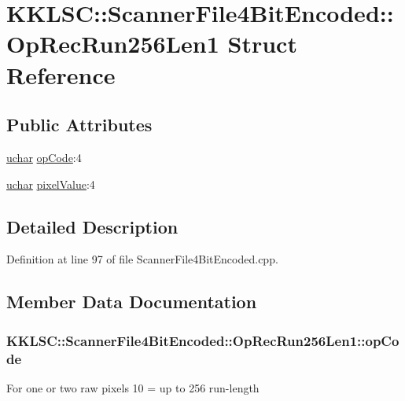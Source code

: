 \hypertarget{struct_scanner_file4_bit_encoded_1_1_op_rec_run256_len1}{}\section{K\+K\+L\+SC\+:\+:Scanner\+File4\+Bit\+Encoded\+:\+:Op\+Rec\+Run256\+Len1 Struct Reference}
\label{struct_scanner_file4_bit_encoded_1_1_op_rec_run256_len1}
\subsection*{Public Attributes}
\begin{DoxyCompactItemize}
\item 
\hyperlink{namespace_k_k_b_ace9969169bf514f9ee6185186949cdf7}{uchar} \hyperlink{struct_scanner_file4_bit_encoded_1_1_op_rec_run256_len1_a67ed46db0ceac48c03b407d8d3d6bc2a}{op\+Code}\+:4
\item 
\hyperlink{namespace_k_k_b_ace9969169bf514f9ee6185186949cdf7}{uchar} \hyperlink{struct_scanner_file4_bit_encoded_1_1_op_rec_run256_len1_adea99eee8f377b27753d33fe4fcd585c}{pixel\+Value}\+:4
\end{DoxyCompactItemize}


\subsection{Detailed Description}


Definition at line 97 of file Scanner\+File4\+Bit\+Encoded.\+cpp.



\subsection{Member Data Documentation}
\subsubsection[{\texorpdfstring{op\+Code}{opCode}}]{ K\+K\+L\+S\+C\+::\+Scanner\+File4\+Bit\+Encoded\+::\+Op\+Rec\+Run256\+Len1\+::op\+Code}\hypertarget{struct_scanner_file4_bit_encoded_1_1_op_rec_run256_len1_a67ed46db0ceac48c03b407d8d3d6bc2a}{}\label{struct_scanner_file4_bit_encoded_1_1_op_rec_run256_len1_a67ed46db0ceac48c03b407d8d3d6bc2a}
For one or two raw pixels 10 = up to 256 run-\/length 

